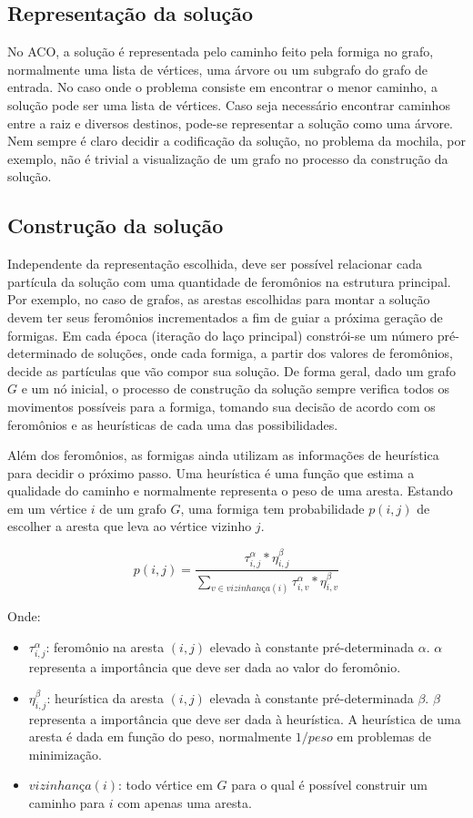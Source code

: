 \subsection{Representação da solução}
No ACO, a solução é representada pelo caminho feito pela formiga no grafo, normalmente uma lista de vértices, uma árvore ou um subgrafo do grafo de entrada. No caso onde o problema consiste em encontrar o menor caminho, a solução pode ser uma lista de vértices. Caso seja necessário encontrar caminhos entre a raiz e diversos destinos, pode-se representar a solução como uma árvore. Nem sempre é claro decidir a codificação da solução, no problema da mochila, por exemplo, não é trivial a visualização de um grafo no processo da construção da solução.

\subsection{Construção da solução} \label{section_construcao_solucao}
\label{section_otimizacao_aco_construcao}
Independente da representação escolhida, deve ser possível relacionar cada partícula da solução com uma quantidade de feromônios na estrutura principal. Por exemplo, no caso de grafos, as arestas escolhidas para montar a solução devem ter seus feromônios incrementados a fim de guiar a próxima geração de formigas. Em cada época (iteração do laço principal) constrói-se um número pré-determinado de soluções, onde cada formiga, a partir dos valores de feromônios, decide as partículas que vão compor sua solução. De forma geral, dado um grafo $G$ e um nó inicial, o processo de construção da solução sempre verifica todos os movimentos possíveis para a formiga, tomando sua decisão de acordo com os feromônios e as heurísticas de cada uma das possibilidades. 

Além dos feromônios, as formigas ainda utilizam as informações de heurística para decidir o próximo passo. Uma heurística é uma função que estima a qualidade do caminho e normalmente representa o peso de uma aresta. Estando em um vértice $i$ de um grafo $G$, uma formiga tem probabilidade $p(i,j)$ de escolher a aresta que leva ao vértice vizinho $j$.

\[ p(i,j) = \frac{\tau_{i,j}^\alpha * \eta_{i,j}^\beta}{\sum_{v \in vizinhança(i)} \tau_{i,v}^\alpha * \eta_{i,v}^\beta} \]

Onde:

\begin{itemize}  
	\item $\tau_{i,j}^\alpha$: feromônio na aresta $(i,j)$ elevado à constante pré-determinada $\alpha$. $\alpha$ representa a importância que deve ser dada ao valor do feromônio.
	\item $\eta_{i,j}^\beta$: heurística da aresta $(i,j)$ elevada à constante pré-determinada $\beta$. $\beta$ representa a importância que deve ser dada à heurística. A heurística de uma aresta é dada em função do peso, normalmente $1/peso$ em problemas de minimização.
	\item $vizinhança(i)$: todo vértice em $G$ para o qual é possível construir um caminho para $i$ com apenas uma aresta.
\end{itemize}

